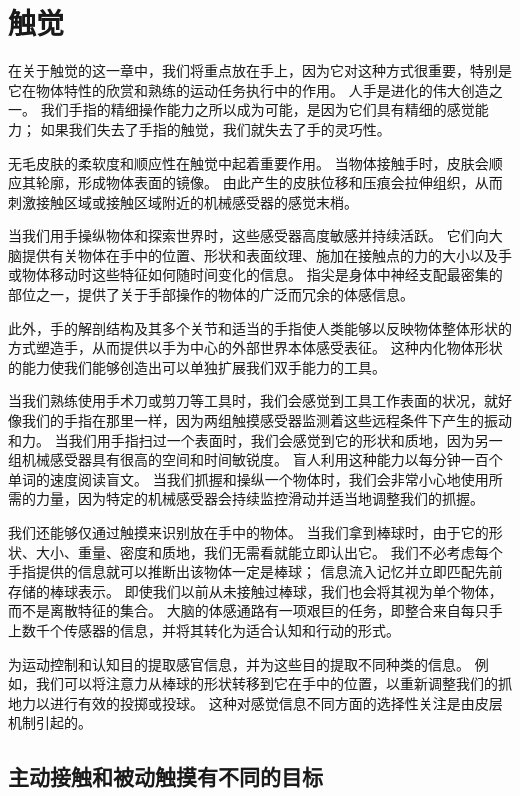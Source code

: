 \chapter{触觉} \label{chap:chap19}

在关于触觉的这一章中，我们将重点放在手上，因为它对这种方式很重要，特别是它在物体特性的欣赏和熟练的运动任务执行中的作用。
人手是进化的伟大创造之一。
我们手指的精细操作能力之所以成为可能，是因为它们具有精细的感觉能力；
如果我们失去了手指的触觉，我们就失去了手的灵巧性。


无毛皮肤的柔软度和顺应性在触觉中起着重要作用。
当物体接触手时，皮肤会顺应其轮廓，形成物体表面的镜像。
由此产生的皮肤位移和压痕会拉伸组织，从而刺激接触区域或接触区域附近的机械感受器的感觉末梢。


当我们用手操纵物体和探索世界时，这些感受器高度敏感并持续活跃。
它们向大脑提供有关物体在手中的位置、形状和表面纹理、施加在接触点的力的大小以及手或物体移动时这些特征如何随时间变化的信息。
指尖是身体中神经支配最密集的部位之一，提供了关于手部操作的物体的广泛而冗余的体感信息。


此外，手的解剖结构及其多个关节和适当的手指使人类能够以反映物体整体形状的方式塑造手，从而提供以手为中心的外部世界本体感受表征。
这种内化物体形状的能力使我们能够创造出可以单独扩展我们双手能力的工具。


当我们熟练使用手术刀或剪刀等工具时，我们会感觉到工具工作表面的状况，就好像我们的手指在那里一样，因为两组触摸感受器监测着这些远程条件下产生的振动和力。
当我们用手指扫过一个表面时，我们会感觉到它的形状和质地，因为另一组机械感受器具有很高的空间和时间敏锐度。
盲人利用这种能力以每分钟一百个单词的速度阅读盲文。 
当我们抓握和操纵一个物体时，我们会非常小心地使用所需的力量，因为特定的机械感受器会持续监控滑动并适当地调整我们的抓握。


我们还能够仅通过触摸来识别放在手中的物体。
当我们拿到棒球时，由于它的形状、大小、重量、密度和质地，我们无需看就能立即认出它。
我们不必考虑每个手指提供的信息就可以推断出该物体一定是棒球；
信息流入记忆并立即匹配先前存储的棒球表示。
即使我们以前从未接触过棒球，我们也会将其视为单个物体，而不是离散特征的集合。
大脑的体感通路有一项艰巨的任务，即整合来自每只手上数千个传感器的信息，并将其转化为适合认知和行动的形式。


为运动控制和认知目的提取感官信息，并为这些目的提取不同种类的信息。
例如，我们可以将注意力从棒球的形状转移到它在手中的位置，以重新调整我们的抓地力以进行有效的投掷或投球。
这种对感觉信息不同方面的选择性关注是由皮层机制引起的。



\section{主动接触和被动触摸有不同的目标}

